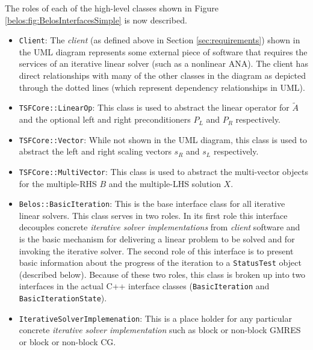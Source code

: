 \documentclass[pdf,ps2pdf,11pt]{SANDreport}
\begin{document}
The roles of each of the high-level classes shown in Figure
{}\ref{belos:fig:BelosInterfacesSimple} is now described.

\begin{itemize}

\item{}\texttt{Client}:
The {}\textit{client} (as defined above in Section
{}\ref{sec:requirements}) shown in the UML diagram represents some
external piece of software that requires the services of an iterative
linear solver (such as a nonlinear ANA).  The client has direct
relationships with many of the other classes in the diagram as
depicted through the dotted lines (which represent dependency
relationships in UML).

\item{}\texttt{TSFCore::LinearOp}:
This class is used to abstract the linear operator for $\tilde{A}$ and
the optional left and right preconditioners $P_L$ and $P_R$
respectively.

\item{}\texttt{TSFCore::Vector}:
While not shown in the UML diagram, this class is used to abstract the
left and right scaling vectors $s_R$ and $s_L$ respectively.

\item{}\texttt{TSFCore::MultiVector}:
This class is used to abstract the multi-vector objects for the
multiple-RHS $B$ and the multiple-LHS solution $X$.

\item{}\texttt{Belos::BasicIteration}:
This is the base interface class for all iterative linear solvers.
This class serves in two roles.  In its first role this interface
decouples concrete {}\textit{iterative solver implementations} from
{}\textit{client} software and is the basic mechanism for delivering a
linear problem to be solved and for invoking the iterative solver.
The second role of this interface is to present basic information
about the progress of the iteration to a {}\texttt{Status\-Test}
object (described below).  Because of these two roles, this class is
broken up into two interfaces in the actual C++ interface classes
({}\texttt{Basic\-Iteration} and {}\texttt{Basic\-Iteration\-State}).

\item{}\texttt{IterativeSolverImplemenation}:
This is a place holder for any particular concrete {}\textit{iterative
solver implementation} such as block or non-block GMRES or block or
non-block CG.


\end{itemize}
\end{document}
